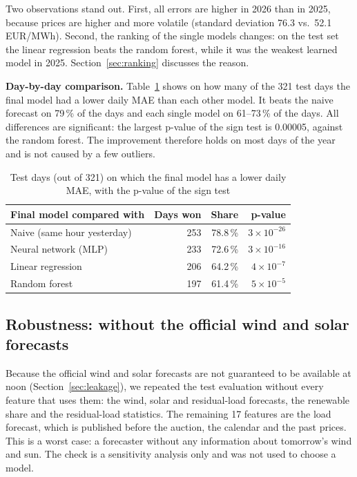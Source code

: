 \documentclass[12pt,oneside]{article}
\begin{document}
Two observations stand out. First, all errors are higher in 2026 than in 2025, because prices are higher and more volatile (standard deviation 76.3 vs.\ 52.1\,EUR/MWh). Second, the ranking of the single models changes: on the test set the linear regression beats the random forest, while it was the weakest learned model in 2025. Section~\ref{sec:ranking} discusses the reason.

\textbf{Day-by-day comparison.} Table~\ref{tab:wins} shows on how many of the 321 test days the final model had a lower daily MAE than each other model. It beats the naive forecast on 79\,\% of the days and each single model on 61--73\,\% of the days. All differences are significant: the largest p-value of the sign test is 0.00005, against the random forest. The improvement therefore holds on most days of the year and is not caused by a few outliers.

\begin{table}[!htbp]
    \centering
    \caption{Test days (out of 321) on which the final model has a lower daily MAE, with the p-value of the sign test}
    \begin{tabular}{lrrr}
        \toprule
        Final model compared with & Days won & Share & p-value \\
        \midrule
        Naive (same hour yesterday) & 253 & 78.8\,\% & $3 \times 10^{-26}$ \\
        Neural network (MLP) & 233 & 72.6\,\% & $3 \times 10^{-16}$ \\
        Linear regression & 206 & 64.2\,\% & $4 \times 10^{-7}$ \\
        Random forest & 197 & 61.4\,\% & $5 \times 10^{-5}$ \\
        \bottomrule
    \end{tabular}
    \label{tab:wins}
\end{table}

\subsection{Robustness: without the official wind and solar forecasts} \label{sec:robust}

Because the official wind and solar forecasts are not guaranteed to be available at noon (Section~\ref{sec:leakage}), we repeated the test evaluation without every feature that uses them: the wind, solar and residual-load forecasts, the renewable share and the residual-load statistics. The remaining 17 features are the load forecast, which is published before the auction, the calendar and the past prices. This is a worst case: a forecaster without any information about tomorrow's wind and sun. The check is a sensitivity analysis only and was not used to choose a model.
\end{document}
